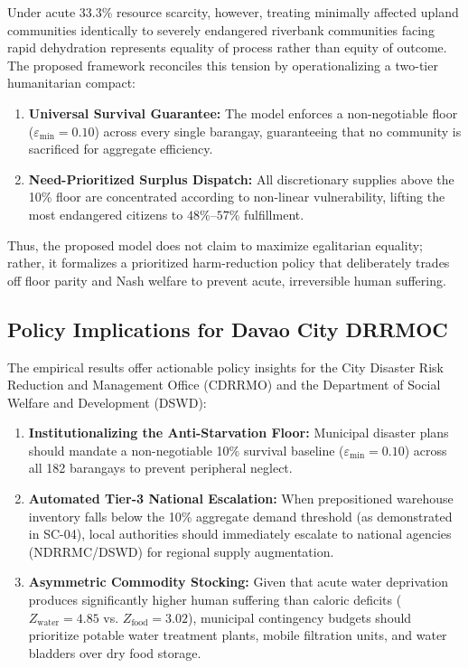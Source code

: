 Under acute 33.3\% resource scarcity, however, treating minimally affected upland communities identically to severely endangered riverbank communities facing rapid dehydration represents equality of process rather than equity of outcome. The proposed framework reconciles this tension by operationalizing a two-tier humanitarian compact:
\begin{enumerate}
    \item \textbf{Universal Survival Guarantee:} The model enforces a non-negotiable floor ($\varepsilon_{\min} = 0.10$) across every single barangay, guaranteeing that no community is sacrificed for aggregate efficiency.
    \item \textbf{Need-Prioritized Surplus Dispatch:} All discretionary supplies above the 10\% floor are concentrated according to non-linear vulnerability, lifting the most endangered citizens to $48\%$--$57\%$ fulfillment.
\end{enumerate}
Thus, the proposed model does not claim to maximize egalitarian equality; rather, it formalizes a prioritized harm-reduction policy that deliberately trades off floor parity and Nash welfare to prevent acute, irreversible human suffering.

\subsection{Policy Implications for Davao City DRRMOC}
The empirical results offer actionable policy insights for the City Disaster Risk Reduction and Management Office (CDRRMO) and the Department of Social Welfare and Development (DSWD):
\begin{enumerate}
    \item \textbf{Institutionalizing the Anti-Starvation Floor:} Municipal disaster plans should mandate a non-negotiable 10\% survival baseline ($\varepsilon_{\min} = 0.10$) across all 182 barangays to prevent peripheral neglect.
    \item \textbf{Automated Tier-3 National Escalation:} When prepositioned warehouse inventory falls below the 10\% aggregate demand threshold (as demonstrated in SC-04), local authorities should immediately escalate to national agencies (NDRRMC/DSWD) for regional supply augmentation.
    \item \textbf{Asymmetric Commodity Stocking:} Given that acute water deprivation produces significantly higher human suffering than caloric deficits ($Z_{\text{water}} = 4.85$ vs. $Z_{\text{food}} = 3.02$), municipal contingency budgets should prioritize potable water treatment plants, mobile filtration units, and water bladders over dry food storage.
\end{enumerate}


